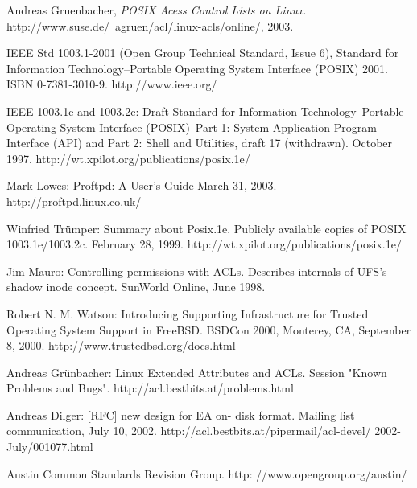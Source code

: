 \begin{thebibliography}{9}
 
  Andreas Gruenbacher,
  \emph{POSIX Acess Control Lists on Linux}.
  http://www.suse.de/~agruen/acl/linux-acls/online/,
  2003.

    IEEE Std 1003.1-2001 (Open Group Technical Standard, Issue 6), 
	Standard for Information Technology--Portable Operating System Interface (POSIX) 2001. 
	ISBN 0-7381-3010-9. 
	http://www.ieee.org/

    IEEE 1003.1e and 1003.2c: Draft Standard for Information Technology--Portable Operating System Interface (POSIX)--Part 1: System Application Program Interface (API) and Part 2: Shell and Utilities, draft 17 (withdrawn). 
	October 1997. 
	http://wt.xpilot.org/publications/posix.1e/

	Mark Lowes: 
	Proftpd: 
	A User's Guide March 31, 2003. 
	http://proftpd.linux.co.uk/

    Winfried Trümper: Summary about Posix.1e. Publicly available copies of POSIX 1003.1e/1003.2c. February 28, 1999. http://wt.xpilot.org/publications/posix.1e/

	Jim Mauro: Controlling permissions with ACLs. Describes internals of UFS's shadow inode concept. SunWorld Online, June 1998.

	Robert N. M. Watson: Introducing Supporting Infrastructure for Trusted Operating System Support in FreeBSD. BSDCon 2000, Monterey, CA, September 8, 2000. http://www.trustedbsd.org/docs.html
	
	Andreas Grünbacher: Linux Extended Attributes and ACLs. Session "Known Problems and Bugs". http://acl.bestbits.at/problems.html
	
	Andreas Dilger: [RFC] new design for EA on- disk format. Mailing list communication, July 10, 2002. http://acl.bestbits.at/pipermail/acl-devel/ 2002-July/001077.html
	
	Austin Common Standards Revision Group. http: //www.opengroup.org/austin/

\end{thebibliography}
